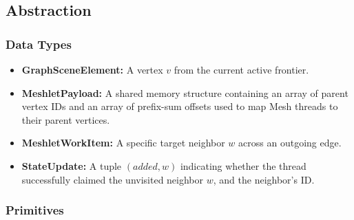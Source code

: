 \documentclass[11pt, a4paper]{article}
\begin{document}
\subsection{Abstraction}
\subsubsection{Data Types}
\begin{itemize}
    \item \textbf{GraphSceneElement:} A vertex $v$ from the current active frontier.
    \item \textbf{MeshletPayload:} A shared memory structure containing an array of parent vertex IDs and an array of prefix-sum offsets used to map Mesh threads to their parent vertices.
    \item \textbf{MeshletWorkItem:} A specific target neighbor $w$ across an outgoing edge.
    \item \textbf{StateUpdate:} A tuple $(added, w)$ indicating whether the thread successfully claimed the unvisited neighbor $w$, and the neighbor's ID.
\end{itemize}

\subsubsection{Primitives}
\end{document}
